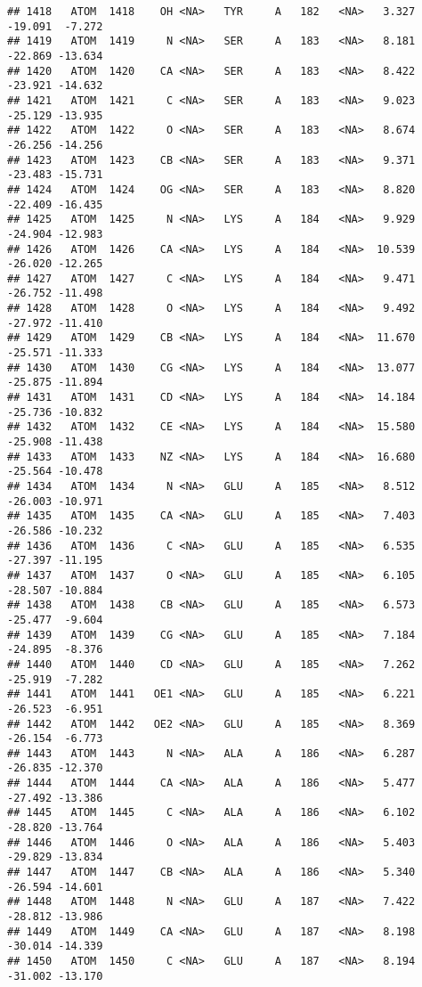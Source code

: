 \documentclass[
]{article}
\begin{document}
\begin{verbatim}
## 1418   ATOM  1418    OH <NA>   TYR     A   182   <NA>   3.327 -19.091  -7.272
## 1419   ATOM  1419     N <NA>   SER     A   183   <NA>   8.181 -22.869 -13.634
## 1420   ATOM  1420    CA <NA>   SER     A   183   <NA>   8.422 -23.921 -14.632
## 1421   ATOM  1421     C <NA>   SER     A   183   <NA>   9.023 -25.129 -13.935
## 1422   ATOM  1422     O <NA>   SER     A   183   <NA>   8.674 -26.256 -14.256
## 1423   ATOM  1423    CB <NA>   SER     A   183   <NA>   9.371 -23.483 -15.731
## 1424   ATOM  1424    OG <NA>   SER     A   183   <NA>   8.820 -22.409 -16.435
## 1425   ATOM  1425     N <NA>   LYS     A   184   <NA>   9.929 -24.904 -12.983
## 1426   ATOM  1426    CA <NA>   LYS     A   184   <NA>  10.539 -26.020 -12.265
## 1427   ATOM  1427     C <NA>   LYS     A   184   <NA>   9.471 -26.752 -11.498
## 1428   ATOM  1428     O <NA>   LYS     A   184   <NA>   9.492 -27.972 -11.410
## 1429   ATOM  1429    CB <NA>   LYS     A   184   <NA>  11.670 -25.571 -11.333
## 1430   ATOM  1430    CG <NA>   LYS     A   184   <NA>  13.077 -25.875 -11.894
## 1431   ATOM  1431    CD <NA>   LYS     A   184   <NA>  14.184 -25.736 -10.832
## 1432   ATOM  1432    CE <NA>   LYS     A   184   <NA>  15.580 -25.908 -11.438
## 1433   ATOM  1433    NZ <NA>   LYS     A   184   <NA>  16.680 -25.564 -10.478
## 1434   ATOM  1434     N <NA>   GLU     A   185   <NA>   8.512 -26.003 -10.971
## 1435   ATOM  1435    CA <NA>   GLU     A   185   <NA>   7.403 -26.586 -10.232
## 1436   ATOM  1436     C <NA>   GLU     A   185   <NA>   6.535 -27.397 -11.195
## 1437   ATOM  1437     O <NA>   GLU     A   185   <NA>   6.105 -28.507 -10.884
## 1438   ATOM  1438    CB <NA>   GLU     A   185   <NA>   6.573 -25.477  -9.604
## 1439   ATOM  1439    CG <NA>   GLU     A   185   <NA>   7.184 -24.895  -8.376
## 1440   ATOM  1440    CD <NA>   GLU     A   185   <NA>   7.262 -25.919  -7.282
## 1441   ATOM  1441   OE1 <NA>   GLU     A   185   <NA>   6.221 -26.523  -6.951
## 1442   ATOM  1442   OE2 <NA>   GLU     A   185   <NA>   8.369 -26.154  -6.773
## 1443   ATOM  1443     N <NA>   ALA     A   186   <NA>   6.287 -26.835 -12.370
## 1444   ATOM  1444    CA <NA>   ALA     A   186   <NA>   5.477 -27.492 -13.386
## 1445   ATOM  1445     C <NA>   ALA     A   186   <NA>   6.102 -28.820 -13.764
## 1446   ATOM  1446     O <NA>   ALA     A   186   <NA>   5.403 -29.829 -13.834
## 1447   ATOM  1447    CB <NA>   ALA     A   186   <NA>   5.340 -26.594 -14.601
## 1448   ATOM  1448     N <NA>   GLU     A   187   <NA>   7.422 -28.812 -13.986
## 1449   ATOM  1449    CA <NA>   GLU     A   187   <NA>   8.198 -30.014 -14.339
## 1450   ATOM  1450     C <NA>   GLU     A   187   <NA>   8.194 -31.002 -13.170

\end{verbatim}
\end{document}
